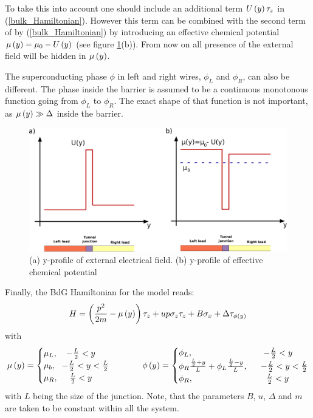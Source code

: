 To take this into account one should include an additional term $ U \left(y\right)\tau_z $ in (\ref{bulk_Hamiltonian}). However this term can be combined with the second term of  by (\ref{bulk_Hamiltonian}) by introducing an effective chemical potential $ \mu \left(y\right) = \mu_0 - U\left(y\right)  $ (see figure \ref{fig:chemandextpotentials}(b)). From now on all presence of  the external field will be hidden in $ \mu\left(y\right) $.

The superconducting phase $ \phi $ in left and right wires, $ \phi_L $ and $ \phi_R $, can also be different. The phase inside the barrier is assumed to be a continuous monotonous function going from $ \phi_L $ to $ \phi_R $. The exact shape of that function is not important, as $ \mu\left(y\right) \gg \Delta$ inside the   
barrier.



\begin{figure}[H]
	\centering
	\includegraphics[width=0.8\linewidth]{images/chem_and_ext_potentials}
	\caption{(a) y-profile of external electrical field.  (b) y-profile of effective chemical potential}
	\label{fig:chemandextpotentials}
\end{figure}


Finally, the BdG Hamiltonian for the model reads:
\begin{equation}
\label{full_hamiltonian}
H
=
\left(
	\frac{p^2}{2m}
	-\mu\left(y\right)
\right)\tau_z
+
u p \sigma_z \tau_z
+
B\sigma_x	
+
\Delta\tau_{\phi\left(y\right)}
\end{equation}
with
\begin{equation}
\label{full_hamiltonian_suppl}
	\mu\left(y\right)
	=
	\begin{cases}
		\mu_L,~~~  -\frac{L}{2}<y\\
		\mu_b,~~ -\frac{L}{2} <y <\frac{L}{2}\\
		\mu_R, ~~~~ \frac{L}{2}< y  
	\end{cases}
	~~~~~~~~
	\phi\left(y\right)
	=
	\begin{cases}
		\phi_L,&~~~  -\frac{L}{2}<y\\
		\phi_R
		\frac{\frac{L}{2}+y}{L}
		+
		\phi_L
		\frac{\frac{L}{2}-y}{L},
		&~~ -\frac{L}{2} <y <\frac{L}{2}\\
		\phi_R, &~~~~ \frac{L}{2}< y 
	\end{cases}
\end{equation}
with $ L $ being the size of the junction. Note, that the parameters $ B $, $ u $, $ \Delta $ and $ m $ are taken to be constant within all the system.
 
